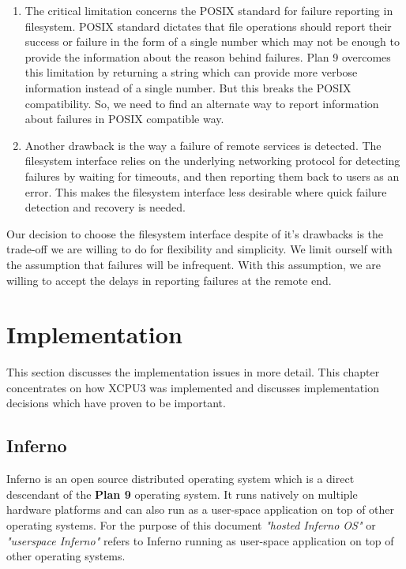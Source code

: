 \documentclass{sig-alternate}
\begin{document}
\begin{enumerate}

\item The critical limitation concerns the POSIX standard for failure
reporting in filesystem.  POSIX standard dictates that file operations should
report their success or failure in the form of a single number which may not be
enough to provide the information about the reason behind failures.  Plan 9
overcomes this limitation by returning a string which can provide more
verbose information instead of a single number.  But this breaks the POSIX
compatibility.  So, we need to find an alternate way to report information
about failures in POSIX compatible way.

\item Another drawback is the way a failure of remote services is detected.
The filesystem interface relies on the underlying networking protocol for
detecting failures by waiting for timeouts, and then reporting them back to
users as an error.  This makes the filesystem interface less desirable where
quick failure detection and recovery is needed.


\end{enumerate}

Our decision to choose the filesystem interface despite of it's drawbacks is the
trade-off we are willing to do for flexibility and simplicity.  We limit
ourself with the assumption that failures will be infrequent.  With this
assumption, we are willing to accept the delays in reporting failures at the
remote end.


\section{Implementation}

This section discusses the implementation issues in more detail.  This chapter
concentrates on how XCPU3 was implemented and discusses implementation
decisions which have proven to be important.


\subsection{Inferno}
Inferno\cite{inferno} is an open source distributed operating system which is a 
direct descendant of the \textbf{Plan 9} operating system.  It runs natively on
multiple hardware platforms and can also run as a user-space application on
top of other operating systems.  For the purpose of this document
\textit{"hosted Inferno OS"} or \textit{"userspace Inferno"} refers to Inferno
running as user-space application on top of other operating systems.
\end{document}
